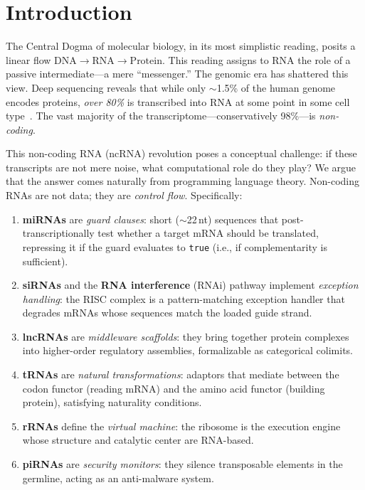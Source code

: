 \documentclass[12pt,a4paper]{article}
\theoremstyle{definition}
\begin{document}
\tableofcontents
\newpage

\section{Introduction}\label{sec:intro}

The Central Dogma of molecular biology, in its most simplistic reading,
posits a linear flow $\text{DNA} \to \text{RNA} \to \text{Protein}$.
This reading assigns to RNA the role of a passive intermediate---a mere
``messenger.''  The genomic era has shattered this view.  Deep
sequencing reveals that while only $\sim$1.5\% of the human genome
encodes proteins, \emph{over 80\%} is transcribed into RNA at some point
in some cell type~\cite{encode2012}.  The vast majority of the
transcriptome---conservatively 98\%---is \emph{non-coding}.

This non-coding RNA (ncRNA) revolution poses a conceptual challenge:
if these transcripts are not mere noise, what computational role do they
play?  We argue that the answer comes naturally from programming language
theory.  Non-coding RNAs are not data; they are \emph{control flow}.
Specifically:

\begin{enumerate}[label=(\roman*)]
  \item \textbf{miRNAs} are \emph{guard clauses}: short ($\sim$22\,nt)
    sequences that post-transcriptionally test whether a target mRNA
    should be translated, repressing it if the guard evaluates to
    \texttt{true} (i.e., if complementarity is sufficient).
  \item \textbf{siRNAs} and the \textbf{RNA interference} (RNAi) pathway
    implement \emph{exception handling}: the RISC complex is a
    pattern-matching exception handler that degrades mRNAs whose
    sequences match the loaded guide strand.
  \item \textbf{lncRNAs} are \emph{middleware scaffolds}: they bring
    together protein complexes into higher-order regulatory assemblies,
    formalizable as categorical colimits.
  \item \textbf{tRNAs} are \emph{natural transformations}: adaptors that
    mediate between the codon functor (reading mRNA) and the amino acid
    functor (building protein), satisfying naturality conditions.
  \item \textbf{rRNAs} define the \emph{virtual machine}: the ribosome
    is the execution engine whose structure and catalytic center are
    RNA-based.
  \item \textbf{piRNAs} are \emph{security monitors}: they silence
    transposable elements in the germline, acting as an anti-malware
    system.
\end{enumerate}
\end{document}
